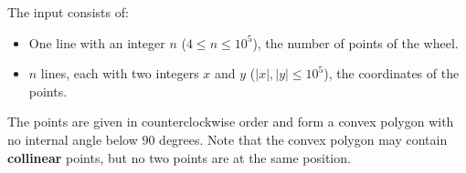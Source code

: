 
    The input consists of:
    \begin{itemize}
        \item One line with an integer $n$ ($4 \leq n \leq 10^5$), the number of points of the wheel.
        \item $n$ lines, each with two integers $x$ and $y$ ($\left| x \right|, \left| y \right| \leq 10^5$), the coordinates of the points.
    \end{itemize}

    The points are given in counterclockwise order and form a convex polygon with no internal angle below $90$ degrees.
    Note that the convex polygon may contain \textbf{collinear} points, but no two points are at the same position.
